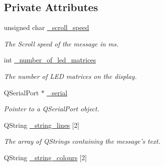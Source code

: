 \subsection*{Private Attributes}
\begin{DoxyCompactItemize}
\item 
\hypertarget{class_matrice_rgb_a4593df682e52dceeeb40cc10da8f7d19}{unsigned char \hyperlink{class_matrice_rgb_a4593df682e52dceeeb40cc10da8f7d19}{\+\_\+scroll\+\_\+speed}}\label{class_matrice_rgb_a4593df682e52dceeeb40cc10da8f7d19}

\begin{DoxyCompactList}\small\item\em The Scroll speed of the message in ms. \end{DoxyCompactList}\item 
\hypertarget{class_matrice_rgb_a3e30ec8b0b50ea4eb417cba8b2b1ce20}{int \hyperlink{class_matrice_rgb_a3e30ec8b0b50ea4eb417cba8b2b1ce20}{\+\_\+number\+\_\+of\+\_\+led\+\_\+matrices}}\label{class_matrice_rgb_a3e30ec8b0b50ea4eb417cba8b2b1ce20}

\begin{DoxyCompactList}\small\item\em The number of L\+E\+D matrices on the display. \end{DoxyCompactList}\item 
\hypertarget{class_matrice_rgb_abec209cc567ab2b491f1b65140f2e9a1}{Q\+Serial\+Port $\ast$ \hyperlink{class_matrice_rgb_abec209cc567ab2b491f1b65140f2e9a1}{\+\_\+serial}}\label{class_matrice_rgb_abec209cc567ab2b491f1b65140f2e9a1}

\begin{DoxyCompactList}\small\item\em Pointer to a Q\+Serial\+Port object. \end{DoxyCompactList}\item 
\hypertarget{class_matrice_rgb_a43eefbe8adeec9f8b899aa9957a769a9}{Q\+String \hyperlink{class_matrice_rgb_a43eefbe8adeec9f8b899aa9957a769a9}{\+\_\+string\+\_\+lines} \mbox{[}2\mbox{]}}\label{class_matrice_rgb_a43eefbe8adeec9f8b899aa9957a769a9}

\begin{DoxyCompactList}\small\item\em The array of Q\+Strings containing the message's text. \end{DoxyCompactList}\item 
\hypertarget{class_matrice_rgb_a7bf7a29cbec11d90407df759baf888fd}{Q\+String \hyperlink{class_matrice_rgb_a7bf7a29cbec11d90407df759baf888fd}{\+\_\+string\+\_\+colours} \mbox{[}2\mbox{]}}\label{class_matrice_rgb_a7bf7a29cbec11d90407df759baf888fd}


\end{DoxyCompactItemize}
